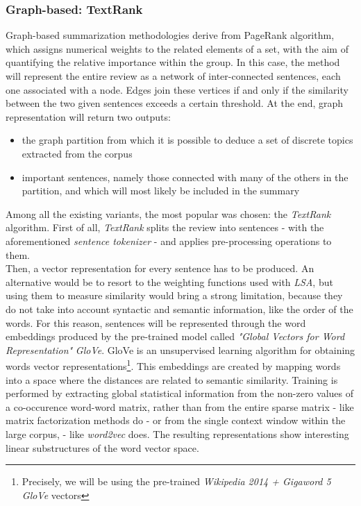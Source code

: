 \documentclass[fleqn,10pt]{SelfArx} %
\begin{document}
\subsubsection{Graph-based: TextRank}
Graph-based summarization methodologies derive from PageRank algorithm, which assigns numerical weights to the related elements of a set, with the aim of quantifying the relative importance within the group. In this case, the method will represent the entire review as a network of inter-connected sentences, each one associated with a node. Edges join these vertices if and only if the similarity between the two given sentences exceeds a certain threshold. At the end, graph representation will return two outputs:
\begin{itemize}
    \item the graph partition from which it is possible to deduce a set of discrete topics extracted from the corpus 
    \item important sentences, namely those connected with many of the others in the partition, and which will most likely be included in the summary
\end{itemize}
Among all the existing variants, the most popular was chosen: the \textit{TextRank} algorithm. First of all, \textit{TextRank} splits the review into sentences - with the aforementioned \textit{sentence tokenizer} - and applies pre-processing operations to them.\\
Then, a vector representation for every sentence has to be produced. An alternative would be to resort to the weighting functions used with \textit{LSA}, but using them to measure similarity would bring a strong limitation, because they do not take into account syntactic and semantic information, like the order of the words. For this reason, sentences will be represented through the word embeddings produced by the pre-trained model called \textit{"Global Vectors for Word Representation"} \textit{GloVe}. GloVe is an unsupervised learning algorithm for obtaining words vector representations\footnote{Precisely, we will be using the pre-trained \textit{Wikipedia 2014 + Gigaword 5 GloVe} vectors}. This embeddings are created by mapping words into a space where the distances are related to semantic similarity. Training is performed by extracting global statistical information from the non-zero values of a co-occurence word-word matrix, rather than 
from the entire sparse matrix - like matrix factorization methods do - or from the single context window within the large corpus, - like \textit{word2vec} does. The resulting representations show interesting linear substructures of the word vector space.\\
\end{document}
